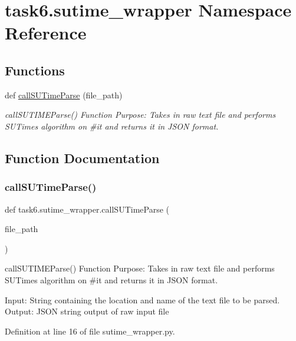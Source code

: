 \hypertarget{namespacetask6_1_1sutime__wrapper}{}\section{task6.\+sutime\+\_\+wrapper Namespace Reference}
\label{namespacetask6_1_1sutime__wrapper}
\subsection*{Functions}
\begin{DoxyCompactItemize}
\item 
def \hyperlink{namespacetask6_1_1sutime__wrapper_af4cac751d594757efbe539a28850ff28}{call\+S\+U\+Time\+Parse} (file\+\_\+path)
\begin{DoxyCompactList}\small\item\em call\+S\+U\+T\+I\+M\+E\+Parse() Function Purpose\+: Takes in raw text file and performs S\+U\+Time\textquotesingle{}s algorithm on \#it and returns it in J\+S\+ON format. \end{DoxyCompactList}\end{DoxyCompactItemize}


\subsection{Function Documentation}
\mbox{\label{namespacetask6_1_1sutime__wrapper_af4cac751d594757efbe539a28850ff28}} 
\subsubsection{\texorpdfstring{call\+S\+U\+Time\+Parse()}{callSUTimeParse()}}
{\footnotesize\ttfamily def task6.\+sutime\+\_\+wrapper.\+call\+S\+U\+Time\+Parse (\begin{DoxyParamCaption}\item[{}]{file\+\_\+path }\end{DoxyParamCaption})}



call\+S\+U\+T\+I\+M\+E\+Parse() Function Purpose\+: Takes in raw text file and performs S\+U\+Time\textquotesingle{}s algorithm on \#it and returns it in J\+S\+ON format. 

Input\+: String containing the location and name of the text file to be parsed. Output\+: J\+S\+ON string output of raw input file 

Definition at line 16 of file sutime\+\_\+wrapper.\+py.

